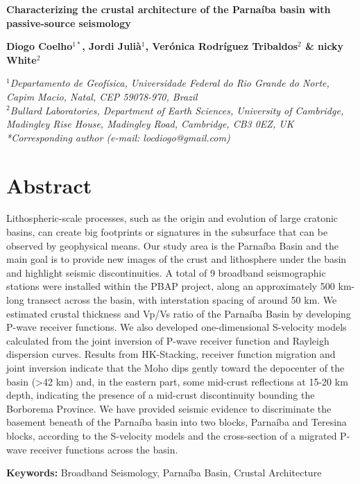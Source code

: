 \documentclass[paper,11pt]{geophysics}
\begin{document}
\begin{center}
\textbf{\LARGE
Characterizing the crustal architecture of the Parnaíba basin with passive-source seismology
}
\linebreak 

\textbf{Diogo Coelho$^{1*}$, Jordi Julià$^{1}$, Verónica Rodríguez Tribaldos$^{2}$ \& nicky White$^{2}$}
\linebreak 

\textit{
$^{1}$Departamento de Geofísica, Universidade Federal do Rio Grande do Norte, Capim Macio, Natal, CEP 59078-970, Brazil
\\
$^{2}$Bullard Laboratories, Department of Earth Sciences, University of Cambridge, Madingley Rise House, Madingley Road, Cambridge, CB3 0EZ, UK
\\
*Corresponding author (e-mail: locdiogo@gmail.com)
}

\end{center} 
\section{Abstract}

Lithospheric-scale processes, such as the origin and evolution of large cratonic basins, can create big footprints or signatures in the subsurface that can be observed by geophysical means. Our study area is the Parnaíba Basin and the main goal is to provide new images of the crust and lithosphere under the basin and highlight seismic discontinuities. A total of 9 broadband seismographic stations were installed within the PBAP project, along an approximately 500 km-long transect across the basin, with interstation spacing of around 50 km. We estimated crustal thickness and Vp/Vs ratio of the Parnaíba Basin by developing P-wave receiver functions. We also developed one-dimensional S-velocity models calculated from the joint inversion of P-wave receiver function and Rayleigh dispersion curves. Results from HK-Stacking, receiver function migration and joint inversion indicate that the Moho dips gently toward the depocenter of the basin (>42 km) and, in the eastern part, some mid-crust reflections at 15-20 km depth, indicating the presence of a mid-crust discontinuity bounding the Borborema Province. We have provided seismic evidence to discriminate the basement beneath of the Parnaíba basin into two blocks, Parnaíba and Teresina blocks, according to the S-velocity models and the cross-section of a migrated P-wave receiver functions across the basin.


\bigskip 
\textbf{Keywords:} Broadband Seismology, Parnaíba Basin, Crustal Architecture
\end{document}
